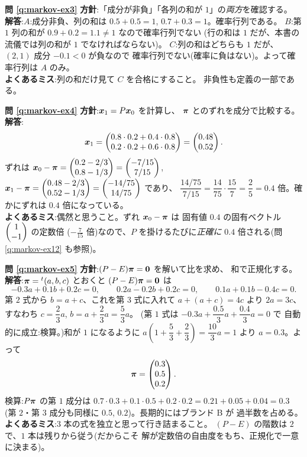 \bigskip
\noindent\textbf{問 \ref{q:markov-ex3}}\quad
\textbf{方針}:「成分が非負」「各列の和が $1$」の\emph{両方}を確認する。\\
\textbf{解答}:$A$:成分非負、列の和は $0.5 + 0.5 = 1$,
$0.7 + 0.3 = 1$。確率行列である。
$B$:第 $1$ 列の和が $0.9 + 0.2 = 1.1 \neq 1$ なので確率行列でない
(行の和は $1$ だが、本書の流儀では列の和が $1$ でなければならない)。
$C$:列の和はどちらも $1$ だが、$(2,1)$ 成分 $-0.1 < 0$ が負なので
確率行列でない(確率に負はない)。よって確率行列は $A$ のみ。\\
\textbf{よくあるミス}:列の和だけ見て $C$ を合格にすること。
非負性も定義の一部である。

\bigskip
\noindent\textbf{問 \ref{q:markov-ex4}}\quad
\textbf{方針}:$\bm{x}_1 = P\bm{x}_0$ を計算し、
$\bm{\pi}$ とのずれを成分で比較する。\\
\textbf{解答}:
\[
\bm{x}_1 = \begin{pmatrix}0.8 \cdot 0.2 + 0.4 \cdot 0.8 \\
0.2 \cdot 0.2 + 0.6 \cdot 0.8\end{pmatrix} = \begin{pmatrix}0.48 \\ 0.52\end{pmatrix}.
\]
ずれは
$\bm{x}_0 - \bm{\pi} = \begin{pmatrix}0.2 - 2/3 \\ 0.8 - 1/3\end{pmatrix}
= \begin{pmatrix}-7/15 \\ 7/15\end{pmatrix}$,
$\bm{x}_1 - \bm{\pi} = \begin{pmatrix}0.48 - 2/3 \\ 0.52 - 1/3\end{pmatrix}
= \begin{pmatrix}-14/75 \\ 14/75\end{pmatrix}$ であり、
$\dfrac{14/75}{7/15} = \dfrac{14}{75} \cdot \dfrac{15}{7} = \dfrac{2}{5}
= 0.4$ 倍。確かにずれは $0.4$ 倍になっている。\\
\textbf{よくあるミス}:偶然と思うこと。ずれ $\bm{x}_0 - \bm{\pi}$ は
固有値 $0.4$ の固有ベクトル $\begin{pmatrix}1 \\ -1\end{pmatrix}$ の定数倍
($-\frac{7}{15}$ 倍)なので、$P$ を掛けるたびに\emph{正確に}
$0.4$ 倍される(問 \ref{q:markov-ex12} も参照)。

\bigskip
\noindent\textbf{問 \ref{q:markov-ex5}}\quad
\textbf{方針}:$(P - E)\bm{\pi} = \bm{0}$ を解いて比を求め、
和で正規化する。\\
\textbf{解答}:$\bm{\pi} = {}^t(a, b, c)$ とおくと
$(P - E)\bm{\pi} = \bm{0}$ は
\[
-0.3a + 0.1b + 0.2c = 0, \qquad
0.2a - 0.2b + 0.2c = 0, \qquad
0.1a + 0.1b - 0.4c = 0.
\]
第 $2$ 式から $b = a + c$、これを第 $3$ 式に入れて
$a + (a + c) = 4c$ より $2a = 3c$、すなわち $c = \dfrac{2}{3}a$,
$b = a + \dfrac{2}{3}a = \dfrac{5}{3}a$。
(第 $1$ 式は $-0.3a + \dfrac{0.5}{3}a + \dfrac{0.4}{3}a = 0$ で
自動的に成立:検算。)和が $1$ になるように
$a\left(1 + \dfrac{5}{3} + \dfrac{2}{3}\right) = \dfrac{10}{3}a = 1$ より
$a = 0.3$。よって
\[
\bm{\pi} = \begin{pmatrix}0.3 \\ 0.5 \\ 0.2\end{pmatrix}.
\]
検算:$P\bm{\pi}$ の第 $1$ 成分は
$0.7 \cdot 0.3 + 0.1 \cdot 0.5 + 0.2 \cdot 0.2 = 0.21 + 0.05 + 0.04 = 0.3$
(第 $2$・第 $3$ 成分も同様に $0.5$, $0.2$)。長期的にはブランド B が
過半数を占める。\\
\textbf{よくあるミス}:$3$ 本の式を独立と思って行き詰まること。
$(P - E)$ の階数は $2$ で、$1$ 本は残りから従う(だからこそ
解が定数倍の自由度をもち、正規化で一意に決まる)。


